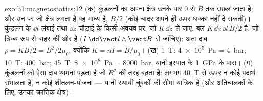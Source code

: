 \begin{solution}{exo:b1:magnetostatics:12}
(क) कुंडलनों का अपना क्षेत्र उनके पार $0$ से $B$ तक उछल जाता है; और उन पर जो
क्षेत्र लगता है वह माध्य है, $B/2$ (कोई चादर अपने ही ऊपर धक्का नहीं दे
सकती)। कुंडलन के $\dd l$ लंबाई तथा $\dd z$ चौड़ाई के किसी अवयव पर, जो
$K\,\dd z$ ले जाए, बल $K\,\dd z\,\dd l\,B/2$ है, जो त्रिज्य रूप से बाहर की ओर है ($I\,\dd\vect l
\wedge\vect B$ से जाँचिए): अतः दाब $p = KB/2 = B^2/2\mu_0$, क्योंकि $K = nI = B/\mu_0$।
(ख) \qty{1}{T}: \qty{4e5}{Pa} = \qty{4}{bar}; \qty{10}{T}: \qty{400}{bar}; \qty{45}{T}:
\qty{8e8}{Pa} = \qty{8000}{bar}, यानी इस्पात के \qty{1}{GPa} के पास। (ग)
कुंडलनों को ऐसा दाब थामना पड़ता है जो $B^2$ की तरह बढ़ता है: लगभग \qty{40}{T}
से ऊपर न कोई पदार्थ सँभालता है, न कोई शीतलन-योजना --- यानी स्थायी चुंबकों की
सीमा यांत्रिक है (और अतिचालकों के लिए, उनका क्रांतिक क्षेत्र)।
\end{solution}

